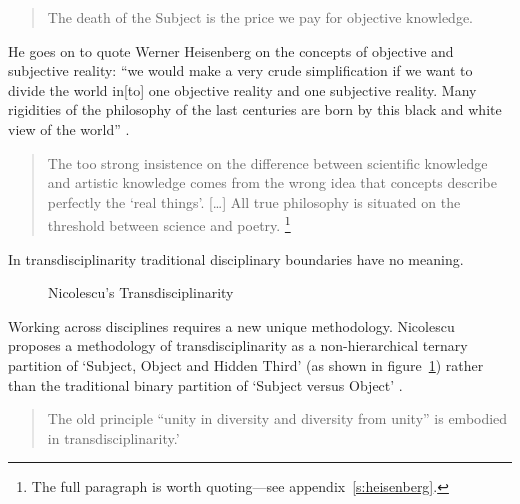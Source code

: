 \begin{quotation}
  The death of the Subject is the price we pay for objective knowledge. 
\end{quotation}

He goes on to quote Werner Heisenberg on the concepts of objective and subjective reality: ``we would make a very crude simplification if we want to divide the world in[to] one objective reality and one subjective reality. Many rigidities of the philosophy of the last centuries are born by this black and white view of the world'' \autocite[Heisenberg, cited in][]{Nicolescu2010}.

\begin{quotation}
  The too strong insistence on the difference between scientific knowledge and artistic knowledge comes from the wrong idea that concepts describe perfectly the `real things'. [\ldots] All true philosophy is situated on the threshold between science and poetry.  \footnote{The full paragraph is worth quoting---see appendix~\ref{s:heisenberg}.}
\end{quotation}

In transdisciplinarity traditional disciplinary boundaries have no meaning.

\begin{figure}[!htbp]
\centering
  \caption[Nicolescu's Transdisciplinarity]{Nicolescu's Transdisciplinarity}
\label{fig:trans}
\end{figure}

Working across disciplines requires a new unique methodology. Nicolescu proposes a methodology of transdisciplinarity as a non-hierarchical ternary partition of `Subject, Object and Hidden Third' (as shown in figure~\ref{fig:trans}) rather than the traditional binary partition of `Subject versus Object' \citeyear{Nicolescu2010}.

\begin{quotation}
  The old principle ``unity in diversity and diversity from unity'' is embodied in transdisciplinarity.' 
\end{quotation}

